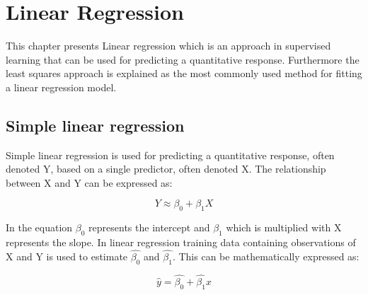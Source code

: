 \chapter{Linear Regression}
\label{chp:linreg}


This chapter presents Linear regression which is an approach in supervised learning that can be used for predicting a quantitative response. Furthermore the least squares approach is explained as the most commonly used method for fitting a linear regression model.

\section{Simple linear regression}

Simple linear regression is used for predicting a quantitative response, often denoted Y, based on a single predictor, often denoted X.
The relationship between X and Y can be expressed as:

\begin{equation}
Y \approx \beta_0 + \beta_1X
\end{equation}

In the equation $\beta_0$ represents the intercept and $\beta_1$ which is multiplied with X represents the slope.
In linear regression training data containing observations of X and Y is used to estimate $\hat{\beta_0}$ and $\hat{\beta_1}$. 
This can be mathematically expressed as:

\begin{equation}
\hat{y} = \hat{\beta_0} + \hat{\beta_1}x
\end{equation}

